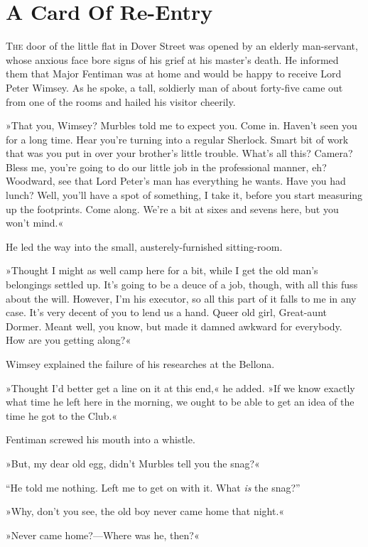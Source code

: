\chapter{A Card Of Re-Entry}
\lettrine[lines=4]{T}{he} door of the little flat in Dover Street was opened by an elderly man-servant, whose anxious face bore signs of his grief at his master's death. He informed them that Major Fentiman was at home and would be happy to receive Lord Peter Wimsey. As he spoke, a tall, soldierly man of about forty-five came out from one of the rooms and hailed his visitor cheerily.

»That you, Wimsey? Murbles told me to expect you. Come in. Haven't seen you for a long time. Hear you're turning into a regular Sherlock. Smart bit of work that was you put in over your brother's little trouble. What's all this? Camera? Bless me, you're going to do our little job in the professional manner, eh? Woodward, see that Lord Peter's man has everything he wants. Have you had lunch? Well, you'll have a spot of something, I take it, before you start measuring up the footprints. Come along. We're a bit at sixes and sevens here, but you won't mind.«

He led the way into the small, austerely-furnished sitting-room.

»Thought I might as well camp here for a bit, while I get the old man's belongings settled up. It's going to be a deuce of a job, though, with all this fuss about the will. However, I'm his executor, so all this part of it falls to me in any case. It's very decent of you to lend us a hand. Queer old girl, Great-aunt Dormer. Meant well, you know, but made it damned awkward for everybody. How are you getting along?«

Wimsey explained the failure of his researches at the Bellona.

»Thought I'd better get a line on it at this end,« he added. »If we know exactly what time he left here in the morning, we ought to be able to get an idea of the time he got to the Club.«

Fentiman screwed his mouth into a whistle.

»But, my dear old egg, didn't Murbles tell you the snag?«

\enquote{He told me nothing. Left me to get on with it. What \textit{is} the snag?}

»Why, don't you see, the old boy never came home that night.«

»Never came home?---Where was he, then?«

